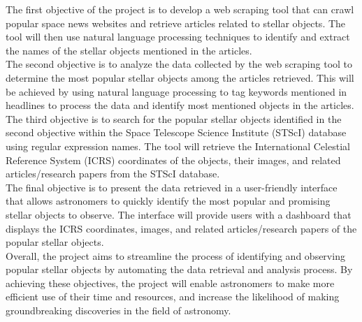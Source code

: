 \documentclass[12pt,letterpaper]{article}
\begin{document}
The first objective of the project is to develop a web scraping tool that can 
crawl popular space news websites and retrieve articles related to stellar objects. 
The tool will then use natural language processing techniques to identify and extract 
the names of the stellar objects mentioned in the articles.\\

The second objective is to analyze the data collected by the web scraping tool 
to determine the most popular stellar objects among the articles retrieved. This 
will be achieved by using natural language processing to tag keywords mentioned 
in headlines to process the data and identify most mentioned objects in the articles.\\

The third objective is to search for the popular stellar objects identified in 
the second objective within the Space Telescope Science Institute (STScI) database 
using regular expression names. The tool will retrieve the  International 
Celestial Reference System (ICRS) coordinates of the objects, their images, 
and related articles/research papers from the STScI database.\\

The final objective is to present the data retrieved in a user-friendly interface 
that allows astronomers to quickly identify the most popular and promising stellar 
objects to observe. The interface will provide users with a dashboard that displays 
the ICRS coordinates, images, and related articles/research papers of the popular stellar objects.\\

Overall, the project aims to streamline the process of identifying and observing 
popular stellar objects by automating the data retrieval and analysis process. 
By achieving these objectives, the project will enable astronomers to make more 
efficient use of their time and resources, and increase the likelihood of making 
groundbreaking discoveries in the field of astronomy.\\
\end{document}

